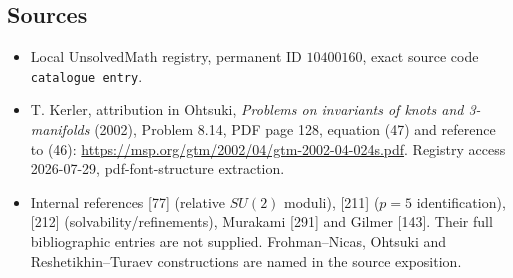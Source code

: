 \documentclass[11pt]{article}
\begin{document}
\subsection{Sources}
\begin{itemize}
\item Local UnsolvedMath registry, permanent ID \(10400160\), exact source code \texttt{catalogue entry}.
\item T. Kerler, attribution in Ohtsuki, \emph{Problems on invariants of knots and 3-manifolds} (2002), Problem 8.14, PDF page 128, equation (47) and reference to (46): \url{https://msp.org/gtm/2002/04/gtm-2002-04-024s.pdf}. Registry access 2026-07-29, pdf-font-structure extraction.
\item Internal references [77] (relative \(SU(2)\) moduli), [211] (\(p=5\) identification), [212] (solvability/refinements), Murakami [291] and Gilmer [143]. Their full bibliographic entries are not supplied. Frohman--Nicas, Ohtsuki and Reshetikhin--Turaev constructions are named in the source exposition.
\end{itemize}
\end{document}
